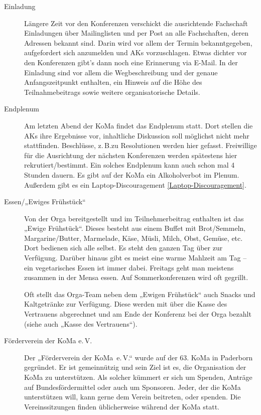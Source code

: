 \begin{description}
\item[Einladung]
    Längere Zeit vor den Konferenzen verschickt die ausrichtende Fachschaft Einladungen über Mailinglisten und per Post an alle Fachschaften, deren Adressen bekannt sind. Darin wird vor allem der Termin bekanntgegeben, aufgefordert sich anzumelden und AKs vorzuschlagen. Etwas dichter vor den Konferenzen gibt’s dann noch eine Erinnerung via E-Mail. In der Einladung sind vor allem die Wegbeschreibung und der genaue Anfangszeitpunkt enthalten, ein Hinweis auf die Höhe des Teilnahmebeitrags sowie weitere organisatorische Details.

\item[Endplenum]
    Am letzten Abend der KoMa findet das Endplenum statt. Dort stellen die AKs ihre Ergebnisse vor, inhaltliche Diskussion soll möglichst nicht mehr stattfinden. Beschlüsse, z.\,B.\@ zu Resolutionen werden hier gefasst. Freiwillige für die Ausrichtung der nächsten Konferenzen werden spätestens hier rekrutiert/bestimmt. Ein solches Endplenum kann auch schon mal 4 Stunden dauern. Es gibt auf der KoMa ein Alkoholverbot im Plenum. Außerdem gibt es ein Laptop-Discouragement \ref{Laptop-Discouragement}.

\item[Essen/„Ewiges Frühstück“]
    Von der Orga bereitgestellt und im Teilnehmerbeitrag enthalten ist das „Ewige Frühstück“. Dieses besteht aus einem Buffet mit Brot/Semmeln, Margarine/Butter, Marmelade, Käse, Müsli, Milch, Obst, Gemüse, etc. Dort bedienen sich alle selbst. Es steht den ganzen Tag über zur Verfügung. Darüber hinaus gibt es meist eine warme Mahlzeit am Tag -- ein vegetarisches Essen ist immer dabei. Freitags geht man meistens zusammen in der Mensa essen. Auf Sommerkonferenzen wird oft gegrillt.

	Oft stellt das Orga-Team neben dem „Ewigen Frühstück“ auch Snacks und Kaltgetränke zur Verfügung. Diese werden mit über die Kasse des Vertrauens abgerechnet und am Ende der Konferenz bei der Orga bezahlt (siehe auch „Kasse des Vertrauens“).

\item[Förderverein der KoMa e.\,V.]
    Der „Förderverein der KoMa~e.\,V.“ wurde auf der 63. KoMa in Paderborn gegründet. Er ist gemeinnützig und sein Ziel ist es, die Organisation der KoMa zu unterstützen. Als solcher kümmert er sich um Spenden, Anträge auf Bundesfördermittel oder auch um Sponsoren. Jeder, der die KoMa unterstützen will, kann gerne dem Verein beitreten, oder spenden. Die Vereinssitzungen finden üblicherweise während der KoMa statt.


\end{description}
